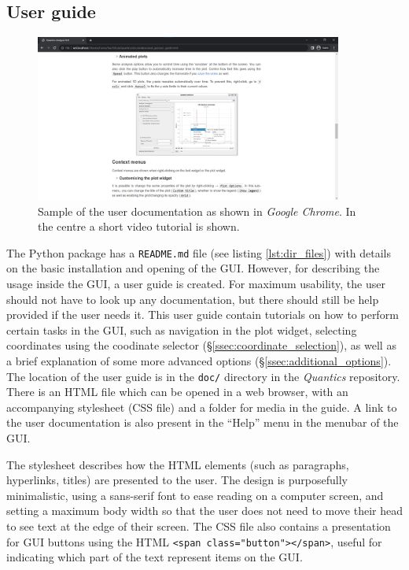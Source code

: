 \documentclass[12pt]{article}
\begin{document}
\subsection{User guide}\label{ssec:user_guide}

\begin{figure}[h]
    \centering
    \includegraphics[width=0.9\textwidth]{img/doc.png}
    \caption{Sample of the user documentation as shown in \textit{Google Chrome}. In the centre a short video tutorial is shown.}
    \label{fig:doc}
\end{figure}

\noindent The Python package has a \texttt{README.md} file (see listing \ref{lst:dir_files}) with details on the basic installation and opening of the GUI. However, for describing the usage inside the GUI, a user guide is created. For maximum usability, the user should not have to look up any documentation, but there should still be help provided if the user needs it. This user guide contain tutorials on how to perform certain tasks in the GUI, such as navigation in the plot widget, selecting coordinates using the coodinate selector (\S\ref{ssec:coordinate_selection}), as well as a brief explanation of some more advanced options (\S\ref{ssec:additional_options}). The location of the user guide is in the \texttt{doc/} directory in the \textit{Quantics} repository. There is an HTML file which can be opened in a web browser, with an accompanying stylesheet (CSS file) and a folder for media in the guide. A link to the user documentation is also present in the ``Help'' menu in the menubar of the GUI.

The stylesheet describes how the HTML elements (such as paragraphs, hyperlinks, titles) are presented to the user. The design is purposefully minimalistic, using a sans-serif font to ease reading on a computer screen, and setting a maximum body width so that the user does not need to move their head to see text at the edge of their screen. The CSS file also contains a presentation for GUI buttons using the HTML \texttt{<span class="button"></span>}, useful for indicating which part of the text represent items on the GUI.
\end{document}
